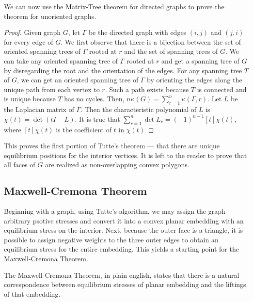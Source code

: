 \documentclass[11pt]{article}
\theoremstyle{definition}
\begin{document}
	We can now use the Matrix-Tree theorem for directed graphs to prove the theorem for unoriented graphs.
	
	\begin{proof}
		Given graph $G$, let $\Gamma$ be the directed graph with edges $(i,j)$ and $(j,i)$ for every edge of $G$. 
		We first observe that there is a bijection between the set of oriented spanning trees of $\Gamma$ rooted at $r$ and the set of spanning trees of $G$. 
		We can take any oriented spanning tree of $\Gamma$ rooted at $r$ and get a spanning tree of $G$ by disregarding the root and the orientation of the edges. 
		For any spanning tree $T$ of $G$, we can get an oriented spanning tree of $\Gamma$ by orienting the edges along the unique path from each vertex to $r$. 
		Such a path exists because $T$ is connected and is unique because $T$ has no cycles. 
		Then, $n \kappa(G) = \sum_{r=1}^{n} \kappa(\Gamma, r)$.
		Let $L$ be the Laplacian matrix of $\Gamma$.
		Then the characteristic polynomial of $L$ is $\chi(t) = \det(tI - L)$.
		It is true that $\sum_{r=1}^{n} \det L_r = (-1)^{n-1} [t]\chi(t)$, where $[t]\chi(t)$ is the coefficient of $t$ in $\chi(t)$
	\end{proof}
	
	This proves the first portion of Tutte's theorem --- that there are unique equilibrium positions for the interior vertices.
	It is left to the reader to prove that all faces of $G$ are realized as non-overlapping convex polygons. 	
	
	
\subsection{Maxwell-Cremona Theorem}
	Beginning with a graph, using Tutte's algorithm, we may assign the graph arbitrary psotive stresses and convert it into a convex planar embedding with an equilibrium stress on the interior. 
	Next, because the outer face is a triangle, it is possible to assign negative weights to the three outer edges to obtain an equilibrium stress for the entire embedding. 
	This yields a starting point for the Maxwell-Cremona Theorem.

 	The Maxwell-Cremona Theorem, in plain english, states that there is a natural correspondence between equilibrium stresses of planar embedding and the liftings of that embedding.
 
\end{document}
